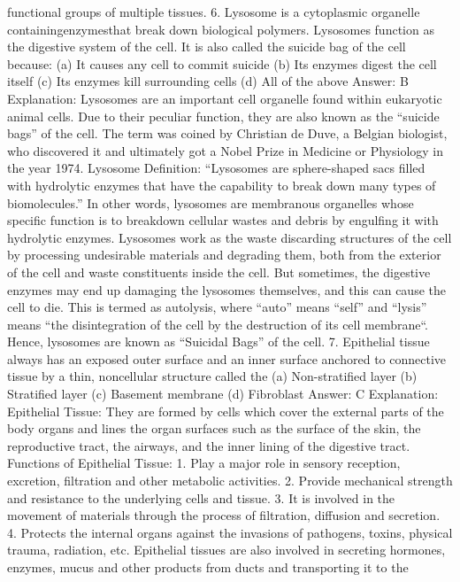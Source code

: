 functional groups of multiple tissues.
6. Lysosome is a cytoplasmic organelle containingenzymesthat
break down biological polymers. Lysosomes function as the
digestive system of the cell. It is also called the suicide bag of
the cell because:
(a) It causes any cell to commit suicide
(b) Its enzymes digest the cell itself
(c) Its enzymes kill surrounding cells
(d) All of the above
Answer: B
Explanation: Lysosomes are an important cell organelle found within
eukaryotic animal cells. Due to their peculiar function, they are also
known as the “suicide bags” of the cell.
The term was coined by Christian de Duve, a Belgian biologist, who
discovered it and ultimately got a Nobel Prize in Medicine or
Physiology in the year 1974.
Lysosome Definition: “Lysosomes are sphere-shaped sacs filled with
hydrolytic enzymes that have the capability to break down many
types of biomolecules.”
In other words, lysosomes are membranous organelles whose specific
function is to breakdown cellular wastes and debris by engulfing it
with hydrolytic enzymes.
Lysosomes work as the waste discarding structures of the cell by
processing undesirable materials and degrading them, both from the
exterior of the cell and waste constituents inside the cell.
But sometimes, the digestive enzymes may end up damaging the
lysosomes themselves, and this can cause the cell to die. This is
termed as autolysis, where “auto” means “self” and “lysis” means
“the disintegration of the cell by the destruction of its cell
membrane“. Hence, lysosomes are known as “Suicidal Bags” of the
cell.
7. Epithelial tissue always has an exposed outer surface and an
inner surface anchored to connective tissue by a thin, noncellular structure called the
(a) Non-stratified layer
(b) Stratified layer
(c) Basement membrane
(d) Fibroblast
Answer: C
Explanation:
Epithelial Tissue: They are formed by cells which cover the external
parts of the body organs and lines the organ surfaces such as the
surface of the skin, the reproductive tract, the airways, and the
inner lining of the digestive tract.
Functions of Epithelial Tissue:
1. Play a major role in sensory reception, excretion, filtration and
other metabolic activities.
2. Provide mechanical strength and resistance to the underlying cells
and tissue.
3. It is involved in the movement of materials through the process
of filtration, diffusion and secretion.
4. Protects the internal organs against the invasions of pathogens,
toxins, physical trauma, radiation, etc.
Epithelial tissues are also involved in secreting hormones, enzymes,
mucus and other products from ducts and transporting it to the
